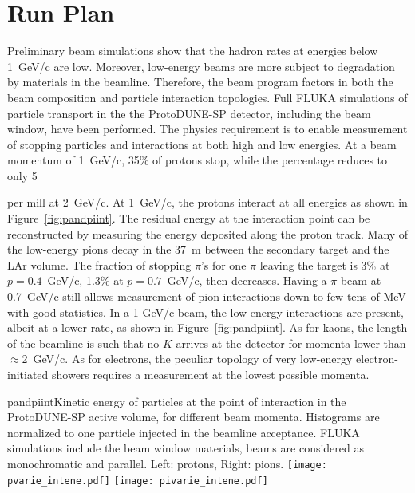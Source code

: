 \section{Run Plan}
\label{sec:runplan}

Preliminary beam simulations show that the hadron rates at 
energies below 1~GeV/c are low. Moreover, low-energy beams are more
subject to degradation by materials in the
beamline.  Therefore, the beam program factors in both the beam composition and 
particle interaction topologies.  Full FLUKA%
 simulations of particle transport in the the ProtoDUNE-SP detector, including the
beam window, have been performed.
 The physics requirement  is %
 to enable measurement of
 stopping particles and  interactions at both high and low energies.    
%
At a beam momentum of 1~GeV/c, 35\% of protons stop, while the percentage reduces to only 5

per mill at 2~GeV/c. 
  At  1~GeV/c,  the protons interact at all
energies as shown in
Figure~\ref{fig:pandpiint}. 
The residual energy at the interaction
point can be reconstructed by measuring the energy deposited along the proton track.
Many of the  low-energy pions decay in the 37~m between the secondary target
and the LAr volume.  The fraction of stopping $\pi$'s for one $\pi$
leaving the target is 3\% at $p=0.4$~GeV/c,  %
1.3\% at $p=0.7$~GeV/c,
then decreases.  Having a $\pi$ beam at 0.7~GeV/c still allows 
measurement of pion interactions down to few tens of MeV with good
statistics. In a 1-GeV/c beam, the low-energy interactions are %
present, albeit at a %
lower rate, as shown in Figure~\ref{fig:pandpiint}.
%
As for kaons, the length of the beamline is such that no
$K$ arrives at the detector for momenta lower than $\approx$2~GeV/c.
As for electrons, the peculiar topology of very low-energy electron-initiated 
showers requires a measurement at the lowest possible momenta.
\begin{cdrfigure}{pandpiint}{Kinetic energy of
    particles at the point of interaction in the ProtoDUNE-SP active
    volume, for different beam momenta. Histograms are normalized to one particle injected in the
    beamline acceptance. FLUKA simulations include the beam window
    materials, beams are considered as monochromatic and
    parallel. Left: protons, Right: pions.}
  \texttt{[image: pvarie\_intene.pdf]}
  \texttt{[image: pivarie\_intene.pdf]}
\end{cdrfigure}


